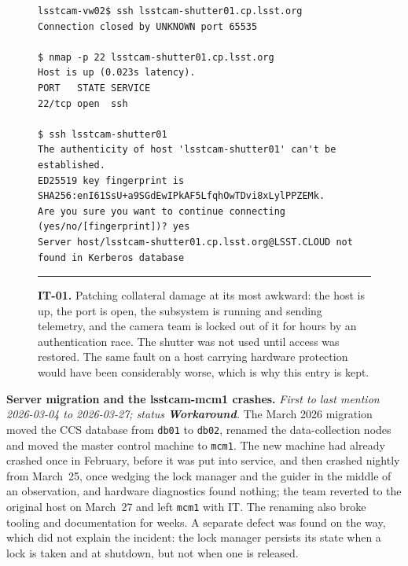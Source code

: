 \begin{description}
\begin{figure}[H]
\begin{minipage}{\textwidth}
\begin{verbatim}
lsstcam-vw02$ ssh lsstcam-shutter01.cp.lsst.org
Connection closed by UNKNOWN port 65535

$ nmap -p 22 lsstcam-shutter01.cp.lsst.org
Host is up (0.023s latency).
PORT   STATE SERVICE
22/tcp open  ssh

$ ssh lsstcam-shutter01
The authenticity of host 'lsstcam-shutter01' can't be established.
ED25519 key fingerprint is SHA256:enI61SsU+a9SGdEwIPkAF5LfqhOwTDvi8xLylPPZEMk.
Are you sure you want to continue connecting (yes/no/[fingerprint])? yes
Server host/lsstcam-shutter01.cp.lsst.org@LSST.CLOUD not found in Kerberos database
\end{verbatim}
\endgroup
\vspace{-10pt}\hrule
\end{minipage}
\caption{\textbf{IT-01.} Patching collateral damage at its most awkward: the host is up, the port is open, the subsystem is running and sending telemetry, and the camera team is locked out of it for hours by an authentication race.  The shutter was not used until access was restored.  The same fault on a host carrying hardware protection would have been considerably worse, which is why this entry is kept.}
\label{fig:iss-IT-01}
\end{figure}

\item[IT-02]\label{iss:IT-02} \textbf{Server migration and the lsstcam-mcm1 crashes.}
  \emph{First to last mention 2026-03-04 to 2026-03-27; status \textcolor{stwrk}{\textbf{Workaround}}.}
  The March 2026 migration moved the CCS database from \texttt{db01} to \texttt{db02}, renamed the data-collection nodes and moved the master control machine to \texttt{mcm1}.  The new machine had already crashed once in February, before it was put into service, and then crashed nightly from March~25, once wedging the lock manager and the guider in the middle of an observation, and hardware diagnostics found nothing; the team reverted to the original host on March~27 and left \texttt{mcm1} with IT.  The renaming also broke tooling and documentation for weeks.  A separate defect was found on the way, which did not explain the incident: the lock manager persists its state when a lock is taken and at shutdown, but not when one is released.

\end{description}

